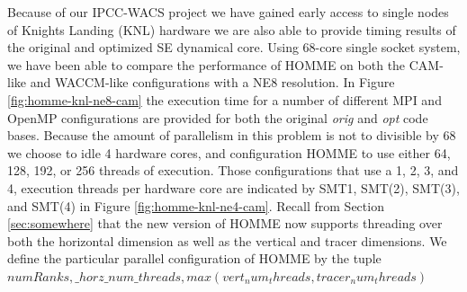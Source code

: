 


Because of our IPCC-WACS project we have gained early access to single nodes of Knights Landing (KNL) hardware we are also able to provide timing results of the original and optimized SE dynamical core.  Using 68-core single socket system, we have been able to compare the performance of HOMME on both the CAM-like and WACCM-like configurations with a NE8 resolution.  In Figure \ref{fig:homme-knl-ne8-cam} the execution time for a number of different MPI and OpenMP configurations are provided for both the original {\em orig} and {\em opt} code bases.  Because the amount of parallelism in this problem is not to divisible by 68 we choose to idle 4 hardware cores, and configuration HOMME to use either 64, 128, 192, or 256 threads of execution.  Those configurations that use a 1, 2, 3, and 4, execution threads per hardware core are indicated by SMT{1}, SMT(2), SMT(3), and SMT(4) in Figure \ref{fig:homme-knl-ne4-cam}.  Recall from Section \ref{sec:somewhere} that the new version of HOMME  now supports threading over both the horizontal dimension as well as the vertical and tracer dimensions.  We define the particular parallel configuration of HOMME by the tuple 
$
numRanks, \_ horz\_num\_threads, max(vert_num_threads,tracer_num_threads)
$
